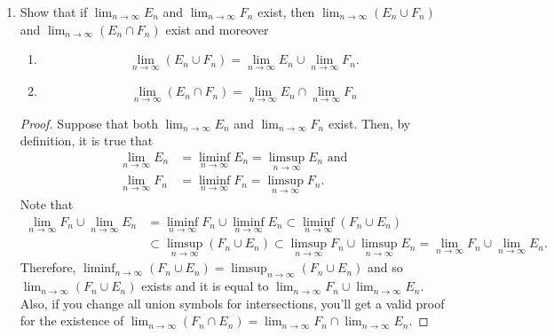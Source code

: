 \documentclass[12pt]{article}
\newenvironment{problem}[2][Problem]{\begin{trivlist}
		\item[\hskip \labelsep {\bfseries #1}\hskip \labelsep {\bfseries #2.}]}{\end{trivlist}}
\begin{document}
\begin{problem}{1}
\begin{enumerate}[label=(\alph*)]
	\item Show that if $\lim_{n\to \infty} E_{n}$ and $\lim_{n\to \infty} F_{n}$ exist, then $\lim_{n\to \infty} \left(E_{n} \cup F_{n}\right)$ and $\lim_{n\to \infty} \left(E_{n}\cap F_{n}\right)$ exist and moreover
		\begin{enumerate}[label=\textbf{\arabic*.}]
		\item  
		\begin{equation*}
			\lim_{n\to \infty} \left(E_{n}\cup F_{n}\right) = \lim_{n\to \infty} E_{n} \cup \lim_{n\to \infty} F_{n}.
		\end{equation*}
		
		\item 
		\begin{equation*}
			\lim_{n\to \infty} \left(E_{n} \cap F_{n}\right) = \lim_{n\to \infty} E_{n} \cap \lim_{n\to \infty} F_{n}
		\end{equation*}
	\end{enumerate}
	
	\begin{proof}
		Suppose that both $\lim_{n\to \infty} E_{n}$ and $\lim_{n\to \infty}F_{n}$ exist. Then, by definition, it is true that
		\begin{align*}
			\lim_{n\to \infty} E_{n} &= \liminf_{n\to \infty} E_{n} = \limsup_{n\to \infty} E_{n} \text{ and}\\
			\lim_{n\to \infty} F_{n} &= \liminf_{n\to \infty} F_{n} = \limsup_{n\to \infty} F_{n}.
		\end{align*}
		Note that
		\begin{align*}
		 \lim_{n\to \infty} F_{n}\cup \lim_{n\to \infty} E_{n} &=	\liminf_{n\to \infty} F_{n} \cup \liminf_{n\to \infty} E_{n}  \subset \liminf_{n\to \infty} \left(F_{n}\cup E_{n}\right)\\
			&\subset \limsup_{n\to \infty} \left(F_{n} \cup E_{n}\right) \subset \limsup_{n\to \infty} F_{n} \cup \limsup_{n\to \infty} E_{n} =\lim_{n\to \infty} F_{n}\cup \lim_{n\to \infty} E_{n} .
		\end{align*}  
	Therefore, $\liminf_{n\to \infty} \left(F_{n} \cup E_{n}\right) = \limsup_{n\to \infty} \left(F_{n} \cup E_{n}\right)$ and so $\lim_{n\to \infty} \left(F_{n} \cup E_{n}\right)$ exists and it is equal to $\lim_{n\to \infty} F_{n} \cup \lim_{n\to \infty} E_{n}$. Also, if you change all union symbols for intersections, you'll get a valid proof for the existence of $\lim_{n\to \infty} \left(F_{n} \cap E_{n}\right) = \lim_{n\to \infty} F_{n} \cap \lim_{n\to \infty} E_{n}$.
	\end{proof}
		\end{enumerate}
	\end{problem}
\end{document}
